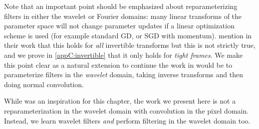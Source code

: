 Note that an important point should be emphasized about reparameterizing filters
in either the wavelet or Fourier domains: many linear
transforms of the parameter space will not change parameter updates if a linear
optimization scheme is used (for example standard GD, or SGD with momentum). 
\citeauthor{rippel_spectral_2015}
mention in their work that this holds for \emph{all} invertible
transforms but this is not strictly true, and we prove in
\autoref{appC:invertible} that it only holds for \emph{tight frames}. 
We make this point clear as a natural extension to continue the work
in \cite{rippel_spectral_2015} would be to parameterize filters in the \emph{wavelet} domain,
taking inverse transforms and then doing normal convolution. 

While \cite{rippel_spectral_2015} was an inspiration for this chapter, the work we
present here is not a reparameterization in the wavelet domain with convolution
in the pixel domain. Instead, we learn wavelet filters \emph{and} perform filtering in the wavelet domain too.

